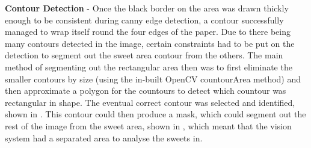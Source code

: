 \textbf{Contour Detection} - Once the black border on the area was drawn thickly enough to be consistent during canny edge detection, a contour successfully managed to wrap itself round the four edges of the paper. Due to there being many contours detected in the image, certain constraints had to be put on the detection to segment out the sweet area contour from the others. The main method of segmenting out the rectangular area then was to first eliminate the smaller contours by size (using the in-built OpenCV countourArea method) and then approximate a polygon for the countours to detect which countour was rectangular in shape. The eventual correct contour was selected and identified, shown in \textbf{}. This contour could then produce a mask, which could segment out the rest of the image from the sweet area, shown in \textbf{}, which meant that the vision system had a separated area to analyse the sweets in.
